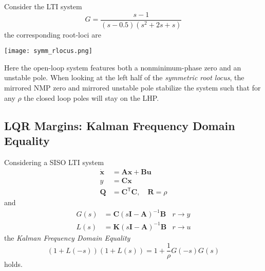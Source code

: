 \begin{examplesection}
    Consider the LTI system
    \noindent\begin{equation*}
        G = \frac{s-1}{(s-0.5)(s^2+2s+s)}
    \end{equation*}
    the corresponding root-loci are
    \begin{center}
        \texttt{[image: symm\_rlocus.png]}
    \end{center}
    Here the open-loop system features both a nonminimum-phase zero and an unstable pole.
    When looking at the left half of the \textit{symmetric root locus}, the mirrored NMP zero and mirrored unstable pole stabilize the system such that
    for any $\rho$ the closed loop poles will stay on the LHP.
\end{examplesection}

\subsection{LQR Margins: Kalman Frequency Domain Equality}
Considering a SISO LTI system
\noindent\begin{align*}
    \dot{\mathbf{x}} & = \mathbf{Ax} + \mathbf{Bu}                                 \\
    y                & = \mathbf{Cx}                                               \\
    \mathbf{Q}       & = \mathbf{C}^{\mathsf{T}} \mathbf{C}, \quad \mathbf{R}=\rho
\end{align*}
and
\noindent\begin{align*}
    G(s) & = \mathbf{C}{(s \mathbf{I}-\mathbf{A})}^{-1}\mathbf{B} & r\to y \\
    L(s) & = \mathbf{K}{(s \mathbf{I}-\mathbf{A})}^{-1}\mathbf{B} & r\to u
\end{align*}
the \textit{Kalman Frequency Domain Equality}
\noindent\begin{equation*}
    (1+L(-s))(1+L(s)) = 1+\frac{1}{\rho}G(-s)G(s)
\end{equation*}
holds.

